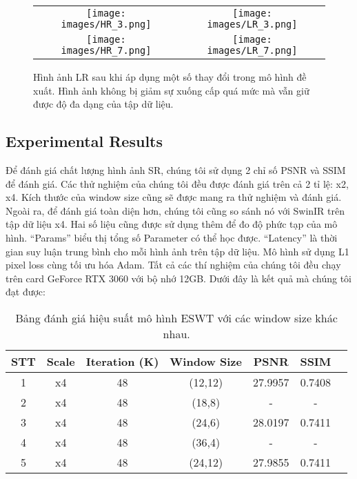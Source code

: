 \documentclass[conference]{IEEEtran}
\begin{document}

\begin{figure}[h] \label{fig:8}
    \begin{tabular}{cc}
        \texttt{[image: images/HR\_3.png]} &
        \texttt{[image: images/LR\_3.png]} \\
        \texttt{[image: images/HR\_7.png]} &
        \texttt{[image: images/LR\_7.png]} \\
    \end{tabular}
    \caption{Hình ảnh LR sau khi áp dụng một số thay đổi trong mô hình đề xuất. Hình ảnh không bị giảm sự xuống cấp quá mức mà vẫn giữ được độ đa dạng của tập dữ liệu.}
\end{figure}

\subsection{Experimental Results} \label{sect:expRes}
Để đánh giá chất lượng hình ảnh SR, chúng tôi sử dụng 2 chỉ số PSNR và SSIM để đánh giá. Các thử nghiệm của chúng tôi đều được đánh giá trên cả 2 tỉ lệ: x2, x4. Kích thước của window size cũng sẽ được mang ra thử nghiệm và đánh giá. Ngoài ra, để đánh giá toàn diện hơn, chúng tôi cũng so sánh nó với SwinIR trên tập dữ liệu x4. Hai số liệu cũng được sử dụng thêm để đo độ phức tạp của mô hình. “Params” biểu thị tổng số Parameter có thể học được. “Latency” là thời gian suy luận trung bình cho mỗi hình ảnh trên tập dữ liệu. Mô hình sử dụng L1 pixel loss cùng tối ưu hóa Adam. Tất cả các thí nghiệm của chúng tôi đều chạy trên card GeForce RTX 3060  với bộ nhớ 12GB. Dưới đây là kết quả mà chúng tôi đạt được:
\begin{table}[!t]
    \centering
    \begin{tabular}{|c|c|c|c|c|c|c|}
    \hline
    STT & Scale & Iteration (K) & Window Size & PSNR & SSIM\\ \hline
    1  & x4 & 48  & (12,12) & 27.9957  & 0.7408   \\ \hline
    2  & x4 & 48  & (18,8) & -  & - \\ \hline
    3  & x4 & 48  & (24,6) & 28.0197 &  0.7411 \\ \hline
    4  & x4 & 48  & (36,4) & - &  - \\ \hline
    5  & x4 & 48  & (24,12) & 27.9855 &  0.7411 \\ \hline
    \end{tabular}
    \caption{Bảng đánh giá hiệu suất mô hình ESWT với các window size khác nhau.}
\end{table}
\end{document}
